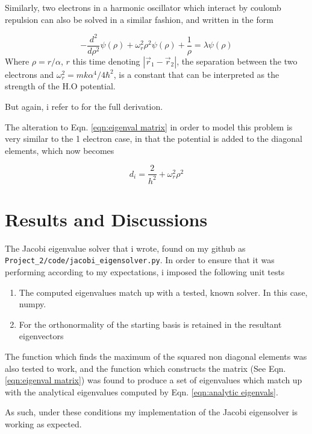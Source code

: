 \documentclass[10pt,showpacs,preprintnumbers,footinbib,amsmath,amssymb,aps,prl,twocolumn,groupedaddress,superscriptaddress,showkeys]{revtex4-1}
\begin{document}
    Similarly, two electrons in a harmonic oscillator which interact by coulomb repulsion can also be solved in a similar fashion, and written in the form

    \begin{equation}
      \label{eqn:2electron_para}
      -\frac{d^2}{d\rho^2} \psi(\rho) + \omega_r^2 \rho^2 \psi(\rho) + \frac{1}{\rho} = \lambda \psi(\rho)
    \end{equation}
    Where $\rho=r/\alpha$, $r$ this time denoting $|\vec r_1 - \vec r_2|$, the separation between the two electrons 
    and $\omega_r^2=mk\alpha^4/4\hbar^2$, is a constant that can be interpreted as the strength of the H.O potential.

    But again, i refer to \cite{question_text} for the full derivation.

    The alteration to Eqn. \ref{eqn:eigenval matrix} in order to model this problem is very similar to the 1 electron case, in that the potential is added to the diagonal elements, which now becomes

    \begin{equation}
      d_i = \frac{2}{h^2} + \omega_r^2 \rho^2
    \end{equation}
\section{Results and Discussions}
  The Jacobi eigenvalue solver that i wrote, found on my github as \lstinline{Project_2/code/jacobi_eigensolver.py}.
  In order to ensure that it was performing according to my expectations, i imposed the following unit tests
  \begin{enumerate}
    \item The computed eigenvalues match up with a tested, known solver. In this case, numpy.
    \item For the orthonormality of the starting basis is retained in the resultant eigenvectors
  \end{enumerate}

  The function which finds the maximum of the squared non diagonal elements was also tested to work, and the function which constructs the matrix (See Eqn. \ref{eqn:eigenval matrix}) was found to produce a set of eigenvalues which match up with the analytical eigenvalues computed by Eqn. \ref{eqn:analytic eigenvals}.

  As such, under these conditions my implementation of the Jacobi eigensolver is working as expected.
\end{document}
